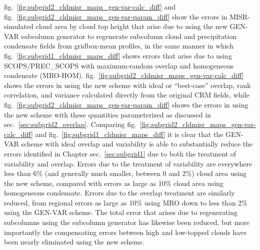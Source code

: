 fig.~\ref{fig:subgrid2_cldmisr_maps_gen-var-calc_diff} and
fig.~\ref{fig:subgrid2_cldmisr_maps_gen-var-param_diff} show the errors
in MISR-simulated cloud area by cloud top height that arise due to using
the new GEN-VAR subcolumn generator to regenerate subcolumn cloud and
precipitation condensate fields from gridbox-mean profiles, in the same
manner in which fig.~\ref{fig:subgrid1_cldmisr_maps_diff} shows errors
that arise due to using SCOPS/PREC\_SCOPS with maximum-random overlap
and homogeneous condensate (MRO-HOM).
fig.~\ref{fig:subgrid2_cldmisr_maps_gen-var-calc_diff} shows the errors
in using the new scheme with ideal or ``best-case'' overlap, rank
correlation, and variance calculated directly from the original CRM
fields, while fig.~\ref{fig:subgrid2_cldmisr_maps_gen-var-param_diff}
shows the errors in using the new scheme with these quantities
parameterized as discussed in sec.~\ref{sec:subgrid2_overlap}. Comparing
fig.~\ref{fig:subgrid2_cldmisr_maps_gen-var-calc_diff} and
fig.~\ref{fig:subgrid1_cldmisr_maps_diff} it is clear that the GEN-VAR
scheme with ideal overlap and variability is able to substantially
reduce the errors identified in Chapter sec.~\ref{sec:subgrid1} due to
both the treatment of variability and overlap. Errors due to the
treatment of variability are everywhere less than 6\% (and generally
much smaller, between 0 and 2\%) cloud area using the new scheme,
compared with errors as large as 10\% cloud area using homogeneous
condensate. Errors due to the overlap treatment are similarly reduced,
from regional errors as large as 10\% using MRO down to less than 2\%
using the GEN-VAR scheme. The total error that arises due to
regenerating subcolumns using the subcolumn generator has likewise been
reduced, but more importantly the compensating errors between high and
low-topped clouds have been nearly eliminated using the new scheme.

